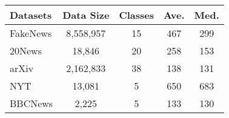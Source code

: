 \small
\begin{tabular}{l|cccc}
\toprule
Datasets   & Data Size  & Classes & Ave.   &  Med. \\
\midrule
FakeNews &8,558,957 &15 &467 &299 \\
20News &18,846 &20 &258 &153 \\
arXiv &2,162,833 &38 &138 &131 \\
NYT &13,081 &5 &650 &683 \\
BBCNews &2,225 &5 &133 &130 \\
\bottomrule
\end{tabular}